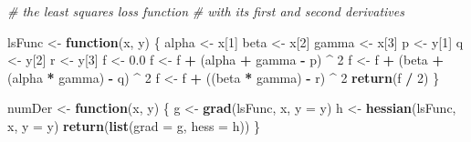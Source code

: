 \documentclass[
  12pt,
]{article}
\newenvironment{Shaded}{\begin{snugshade}}{\end{snugshade}}
\newcommand{\AttributeTok}[1]{\textcolor[rgb]{0.13,0.29,0.53}{#1}}
\newcommand{\CommentTok}[1]{\textcolor[rgb]{0.56,0.35,0.01}{\textit{#1}}}
\newcommand{\ControlFlowTok}[1]{\textcolor[rgb]{0.13,0.29,0.53}{\textbf{#1}}}
\newcommand{\DecValTok}[1]{\textcolor[rgb]{0.00,0.00,0.81}{#1}}
\newcommand{\FloatTok}[1]{\textcolor[rgb]{0.00,0.00,0.81}{#1}}
\newcommand{\FunctionTok}[1]{\textcolor[rgb]{0.13,0.29,0.53}{\textbf{#1}}}
\newcommand{\NormalTok}[1]{#1}
\newcommand{\OtherTok}[1]{\textcolor[rgb]{0.56,0.35,0.01}{#1}}
\newcommand{\SpecialCharTok}[1]{\textcolor[rgb]{0.81,0.36,0.00}{\textbf{#1}}}
\begin{document}
\begin{Shaded}
\begin{Highlighting}[]
\CommentTok{\# the least squares loss function}
\CommentTok{\# with its first and second derivatives}

\NormalTok{lsFunc }\OtherTok{\textless{}{-}} \ControlFlowTok{function}\NormalTok{(x, y) \{}
\NormalTok{  alpha }\OtherTok{\textless{}{-}}\NormalTok{ x[}\DecValTok{1}\NormalTok{]}
\NormalTok{  beta }\OtherTok{\textless{}{-}}\NormalTok{ x[}\DecValTok{2}\NormalTok{]}
\NormalTok{  gamma }\OtherTok{\textless{}{-}}\NormalTok{ x[}\DecValTok{3}\NormalTok{]}
\NormalTok{  p }\OtherTok{\textless{}{-}}\NormalTok{ y[}\DecValTok{1}\NormalTok{]}
\NormalTok{  q }\OtherTok{\textless{}{-}}\NormalTok{ y[}\DecValTok{2}\NormalTok{]}
\NormalTok{  r }\OtherTok{\textless{}{-}}\NormalTok{ y[}\DecValTok{3}\NormalTok{]}
\NormalTok{  f }\OtherTok{\textless{}{-}} \FloatTok{0.0}
\NormalTok{  f }\OtherTok{\textless{}{-}}\NormalTok{ f }\SpecialCharTok{+}\NormalTok{ (alpha }\SpecialCharTok{+}\NormalTok{ gamma }\SpecialCharTok{{-}}\NormalTok{ p) }\SpecialCharTok{\^{}} \DecValTok{2}
\NormalTok{  f }\OtherTok{\textless{}{-}}\NormalTok{ f }\SpecialCharTok{+}\NormalTok{ (beta }\SpecialCharTok{+}\NormalTok{ (alpha }\SpecialCharTok{*}\NormalTok{ gamma) }\SpecialCharTok{{-}}\NormalTok{ q) }\SpecialCharTok{\^{}} \DecValTok{2}
\NormalTok{  f }\OtherTok{\textless{}{-}}\NormalTok{ f }\SpecialCharTok{+}\NormalTok{ ((beta }\SpecialCharTok{*}\NormalTok{ gamma) }\SpecialCharTok{{-}}\NormalTok{ r) }\SpecialCharTok{\^{}} \DecValTok{2}
  \FunctionTok{return}\NormalTok{(f }\SpecialCharTok{/} \DecValTok{2}\NormalTok{)}
\NormalTok{\}}

\NormalTok{numDer }\OtherTok{\textless{}{-}} \ControlFlowTok{function}\NormalTok{(x, y) \{}
\NormalTok{  g }\OtherTok{\textless{}{-}} \FunctionTok{grad}\NormalTok{(lsFunc, x, }\AttributeTok{y =}\NormalTok{ y)}
\NormalTok{  h }\OtherTok{\textless{}{-}} \FunctionTok{hessian}\NormalTok{(lsFunc, x, }\AttributeTok{y =}\NormalTok{ y)}
  \FunctionTok{return}\NormalTok{(}\FunctionTok{list}\NormalTok{(}\AttributeTok{grad =}\NormalTok{ g, }\AttributeTok{hess =}\NormalTok{ h))}
\NormalTok{\}}


\end{Highlighting}
\end{Shaded}
\end{document}
